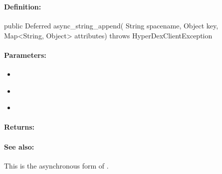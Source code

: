 \pagebreak
\subsubsection{}
\label{api:java:async_string_append}


\paragraph{Definition:}
\begin{javacode}
public Deferred async_string_append(
        String spacename,
        Object key,
        Map<String, Object> attributes) throws HyperDexClientException
\end{javacode}

\paragraph{Parameters:}
\begin{itemize}[noitemsep]
\item {}\\

\item {}\\

\item {}\\

\end{itemize}

\paragraph{Returns:}


\paragraph{See also:}  This is the asynchronous form of .

\pagebreak
\subsubsection{}
\label{api:java:cond_string_append}


